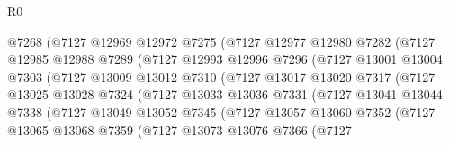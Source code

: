 \begin{lexlean}{R0}
\begin{coremodule}
                        @7268
                        (@7127
                          @12969
                          @12972
                          @7275
                          (@7127
                            @12977
                            @12980
                            @7282
                            (@7127
                              @12985
                              @12988
                              @7289
                              (@7127
                                @12993
                                @12996
                                @7296
                                (@7127
                                  @13001
                                  @13004
                                  @7303
                                  (@7127
                                    @13009
                                    @13012
                                    @7310
                                    (@7127
                                      @13017
                                      @13020
                                      @7317
                                      (@7127
                                        @13025
                                        @13028
                                        @7324
                                        (@7127
                                          @13033
                                          @13036
                                          @7331
                                          (@7127
                                            @13041
                                            @13044
                                            @7338
                                            (@7127
                                              @13049
                                              @13052
                                              @7345
                                              (@7127
                                                @13057
                                                @13060
                                                @7352
                                                (@7127
                                                  @13065
                                                  @13068
                                                  @7359
                                                  (@7127
                                                    @13073
                                                    @13076
                                                    @7366
                                                    (@7127

\end{coremodule}
\end{lexlean}
